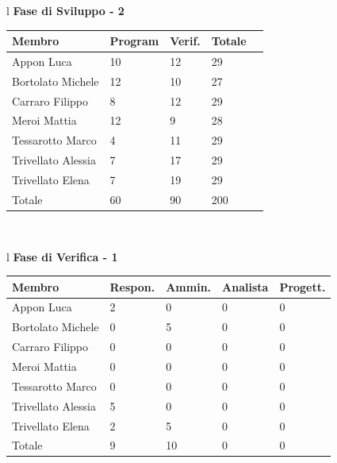 \documentclass[11pt,titlepage,a4paper]{report}
\begin{document}
\begin{table}[hbtp]
\large{
\begin{tabular}{l}
\Large{\textbf{\textsf{Fase di Sviluppo - 2}}} \\
\begin{tabular}{||p{3.5cm}||p{2cm}||p{2cm}||p{2cm}||p{2cm}||}
\hline
\textbf{Membro} & \textbf{Program} & \textbf{Verif.} & \textbf{Totale}\\
\hline
{Appon Luca}&10&12&29 \\ 
\hline 
{Bortolato Michele} &12&10&27\\ 
\hline
{Carraro Filippo}&8&12&29 \\
\hline
{Meroi Mattia}&12&9&28\\
\hline
{Tessarotto Marco} &4&11&29\\
\hline
{Trivellato Alessia} &7&17&29 \\
\hline
{Trivellato Elena} &7&19&29 \\
\hline
{Totale}& 60&90&200 \\
\hline
\end{tabular} \\
\end{tabular}
}
\end{table}


\begin{table}[hbtp]
\large{
\begin{tabular}{l}
\Large{\textbf{\textsf{Fase di Verifica - 1}}} \\
\begin{tabular}{||p{3.5cm}||p{2cm}||p{2cm}||p{2cm}||p{2cm}||}
\hline
\textbf{Membro} & \textbf{Respon.} & \textbf{Ammin.} & \textbf{Analista}
& \textbf{Progett.}\\
\hline
{Appon Luca}&2&0&0&0 \\ 
\hline 
{Bortolato Michele} &0&5&0&0\\ 
\hline
{Carraro Filippo}&0&0&0&0 \\
\hline
{Meroi Mattia}&0&0&0&0\\
\hline
{Tessarotto Marco} &0&0&0&0\\
\hline
{Trivellato Alessia} &5&0&0&0 \\
\hline
{Trivellato Elena} &2&5&0&0 \\
\hline
{Totale}& 9&10&0&0 \\
\hline
\end{tabular} \\
\end{tabular}
}
\end{table}
\end{document}
